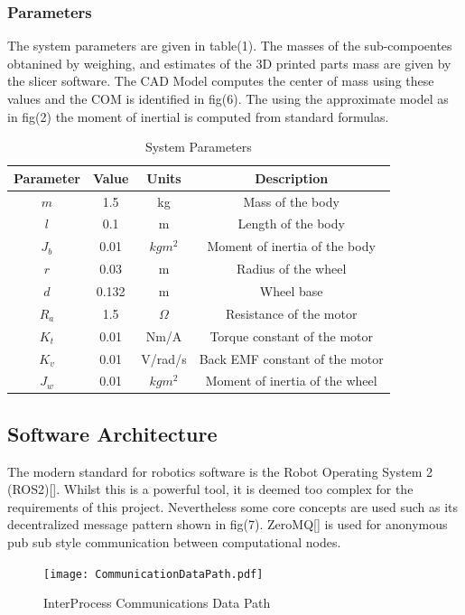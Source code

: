         \subsubsection{Parameters }
        The system parameters are given in table(1). 
        The masses of the sub-compoentes obtanined by weighing,
        and estimates of the 3D printed parts mass are given by the slicer software. 
        The CAD Model computes the center of mass using these values and the COM is identified in fig(6).
        The using the approximate model as in fig(2) the moment of inertial is computed from standard formulas.
        \begin{table} [H]
            \centering
            \begin{tabular}{|c|c|c|c|}
                \hline
                Parameter & Value & Units & Description \\
                \hline
                $m$ & 1.5 & kg & Mass of the body \\
                $l$ & 0.1 & m & Length of the body \\
                $J_b$ & 0.01 & $kgm^2$ & Moment of inertia of the body \\
                $r$ & 0.03 & m & Radius of the wheel \\
                $d$ & 0.132 & m & Wheel base \\
                $R_a$ & 1.5 & $\Omega$ & Resistance of the motor \\
                $K_t$ & 0.01 & Nm/A & Torque constant of the motor \\
                $K_v$ & 0.01 & V/rad/s & Back EMF constant of the motor \\
                $J_w$ & 0.01 & $kgm^2$ & Moment of inertia of the wheel \\
                \hline
            \end{tabular}
            \caption{System Parameters}
        \end{table}

       
        
        \pagebreak{}
        \subsection{Software Architecture}
        The modern standard for robotics software is the Robot Operating System 2 (ROS2)[]. 
        Whilst this is a powerful tool, it is deemed too complex for the requirements of this project.
        Nevertheless some core concepts are used such as its 
        decentralized message pattern shown in fig(7). ZeroMQ[] is used for 
        anonymous pub sub style communication between computational nodes.
        \begin{figure} [H]
            \texttt{[image: CommunicationDataPath.pdf]}  
            \caption{InterProcess Communications Data Path}
        \end{figure}


